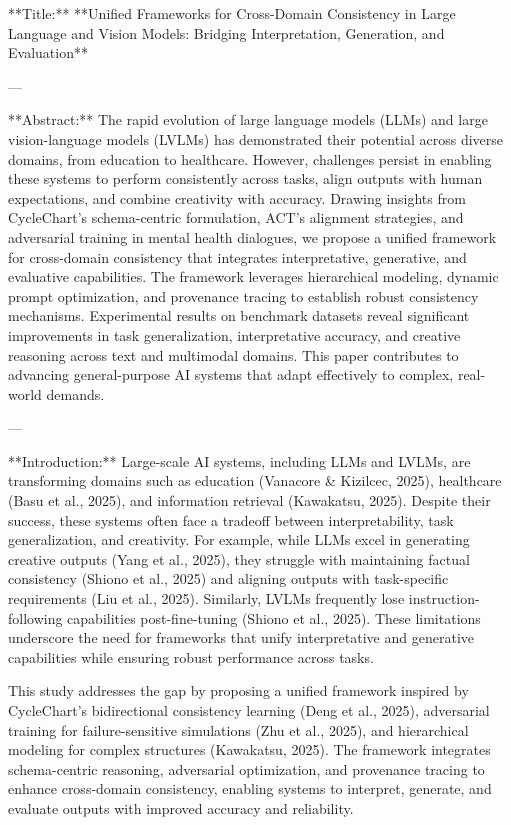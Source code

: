 **Title:**  
**Unified Frameworks for Cross-Domain Consistency in Large Language and Vision Models: Bridging Interpretation, Generation, and Evaluation**

---

**Abstract:**  
The rapid evolution of large language models (LLMs) and large vision-language models (LVLMs) has demonstrated their potential across diverse domains, from education to healthcare. However, challenges persist in enabling these systems to perform consistently across tasks, align outputs with human expectations, and combine creativity with accuracy. Drawing insights from CycleChart’s schema-centric formulation, ACT’s alignment strategies, and adversarial training in mental health dialogues, we propose a unified framework for cross-domain consistency that integrates interpretative, generative, and evaluative capabilities. The framework leverages hierarchical modeling, dynamic prompt optimization, and provenance tracing to establish robust consistency mechanisms. Experimental results on benchmark datasets reveal significant improvements in task generalization, interpretative accuracy, and creative reasoning across text and multimodal domains. This paper contributes to advancing general-purpose AI systems that adapt effectively to complex, real-world demands.

---

**Introduction:**  
Large-scale AI systems, including LLMs and LVLMs, are transforming domains such as education (Vanacore & Kizilcec, 2025), healthcare (Basu et al., 2025), and information retrieval (Kawakatsu, 2025). Despite their success, these systems often face a tradeoff between interpretability, task generalization, and creativity. For example, while LLMs excel in generating creative outputs (Yang et al., 2025), they struggle with maintaining factual consistency (Shiono et al., 2025) and aligning outputs with task-specific requirements (Liu et al., 2025). Similarly, LVLMs frequently lose instruction-following capabilities post-fine-tuning (Shiono et al., 2025). These limitations underscore the need for frameworks that unify interpretative and generative capabilities while ensuring robust performance across tasks.

This study addresses the gap by proposing a unified framework inspired by CycleChart’s bidirectional consistency learning (Deng et al., 2025), adversarial training for failure-sensitive simulations (Zhu et al., 2025), and hierarchical modeling for complex structures (Kawakatsu, 2025). The framework integrates schema-centric reasoning, adversarial optimization, and provenance tracing to enhance cross-domain consistency, enabling systems to interpret, generate, and evaluate outputs with improved accuracy and reliability.

